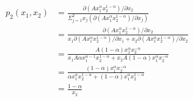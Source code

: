 \documentclass{article}
\begin{document}
\begin{align*}
p_2(x_1,x_2) &=  \frac{\partial (Ax_1^{\alpha}x_2^{1-\alpha}) / \partial x_2}{\Sigma^{2}_{j=1} x_j( \partial (Ax_1^{\alpha}x_2^{1-\alpha}) / \partial x_j)} \\
&=\frac{\partial (Ax_1^{\alpha}x_2^{1-\alpha}) / \partial x_2}{x_1 \partial (Ax_1^{\alpha}x_2^{1-\alpha}) / \partial x_1 + x_2  \partial (Ax_1^{\alpha}x_2^{1-\alpha}) / \partial x_2} \\
&=\frac{A(1-\alpha) x_1^{\alpha}x_2^{-\alpha}}{x_1 A\alpha x_1^{\alpha -1}x_2^{1-\alpha} + x_2A(1-\alpha) x_1^{\alpha}x_2^{-\alpha}} \\
&=\frac{(1-\alpha) x_1^{\alpha}x_2^{-\alpha}}{\alpha x_1^{\alpha}x_2^{1-\alpha} + (1-\alpha) x_1^{\alpha}x_2^{1-\alpha}} \\
&=\frac{1-\alpha}{x_2}
\end{align*}
\end{document}
